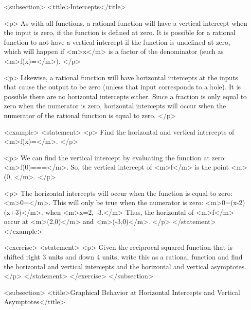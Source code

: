     <subsection>
        <title>Intercepts</title>

        <p>
            As with all functions, a rational function will have a vertical intercept when the input is zero, if the function is defined at zero.
            It is possible for a rational function to not have a vertical intercept if the function is undefined at zero, which will happen if <m>x</m> is a factor of the denominator (such as <m>f(x)=</m>).
        </p>

        <p>
            Likewise, a rational function will have horizontal intercepts at the inputs that cause the output to be zero (unless that input corresponds to a hole).
            It is possible there are no horizontal intercepts either.
            Since a fraction is only equal to zero when the numerator is zero, horizontal intercepts will occur when the numerator of the rational function is equal to zero.
        </p>

        <example>
            <statement>
                <p>
                    Find the horizontal and vertical intercepts of <m>f(x)=</m>.
                </p>

                <p>
                    We can find the vertical intercept by evaluating the function at zero: <m>f(0)===</m>.
                    So, the vertical intercept of <m>f</m> is the point <m>(0, </m>.
                </p>

                <p>
                    The horizontal intercepts will occur when the function is equal to zero: <m>0=</m>.
                    This will only be true when the numerator is zero: <m>0=(x-2)(x+3)</m>, when <m>x=2, -3.</m> Thus, the horizontal of <m>f</m> occur at <m>(2,0)</m> and <m>(-3,0)</m>.
                </p>
            </statement>
        </example>

        <exercise>
            <statement>
                <p>
                    Given the reciprocal squared function that is shifted right 3 units and down 4 units, write this as a rational function and find the horizontal and vertical intercepts and the horizontal and vertical asymptotes.
                </p>
            </statement>
        </exercise>
    </subsection>


    <subsection>
        <title>Graphical Behavior at Horizontal Intercepts and Vertical Asymptotes</title>

